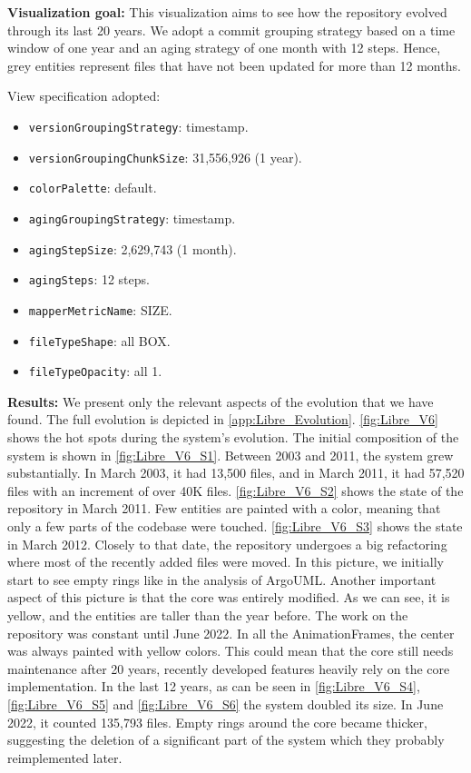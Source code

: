 \bigbreak
\textbf{Visualization goal:}
This visualization aims to see how the repository evolved through its last 20 years. We adopt a commit grouping strategy based on a time window of one year and an aging strategy of one month with 12 steps. Hence, grey entities represent files that have not been updated for more than 12 months. 


View specification adopted: 
\begin{itemize}
    \item \texttt{versionGroupingStrategy}: timestamp.
    \item \texttt{versionGroupingChunkSize}: 31,556,926 (1 year). 
    \item \texttt{colorPalette}: default.
    \item \texttt{agingGroupingStrategy}: timestamp.
    \item \texttt{agingStepSize}: 2,629,743 (1 month).
    \item \texttt{agingSteps}: 12 steps.
    \item \texttt{mapperMetricName}: SIZE. 
    \item \texttt{fileTypeShape}: all BOX. 
    \item \texttt{fileTypeOpacity}: all 1. 
\end{itemize}

\textbf{Results:}
We present only the relevant aspects of the evolution that we have found. The full evolution is depicted in \autoref{app:Libre_Evolution}. \autoref{fig:Libre_V6} shows the hot spots during the system's evolution. The initial composition of the system is shown in \autoref{fig:Libre_V6_S1}. Between 2003 and 2011, the system 
grew substantially. In March 2003, it had 13,500 files, and in March 2011, it had 57,520 files with an increment of over 40K files. \autoref{fig:Libre_V6_S2} shows the state of the repository in March 2011. Few entities are painted with a color, meaning that only a few parts of the codebase were touched. \autoref{fig:Libre_V6_S3} shows the state in March 2012. Closely to that date, the repository undergoes a big refactoring where most of the recently added files were moved. In this picture, we initially start to see empty rings like in the analysis of ArgoUML. Another important aspect of this picture is that the core was entirely modified. As we can see, it is yellow, and the entities are taller than the year before. The work on the repository was constant until June 2022. In all the AnimationFrames, the center was always painted with yellow colors. This could mean that the core still needs maintenance after 20 years, recently developed features heavily rely on the core implementation. In the last 12 years, as can be seen in \autoref{fig:Libre_V6_S4}, \autoref{fig:Libre_V6_S5} and \autoref{fig:Libre_V6_S6} the system doubled its size. In June 2022, it counted 135,793 files. Empty rings around the core became thicker, suggesting the deletion of a significant part of the system which they probably reimplemented later.

